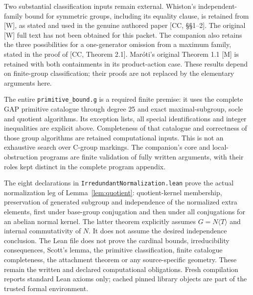 Two substantial classification inputs remain external. Whiston's
independent-family bound for symmetric groups, including its equality
clause, is retained from [W], as stated and used in the genuine authored
paper [CC, \S\S1--2]. The original [W] full text has not been obtained
for this packet. The companion also retains the three possibilities
for a one-generator omission from a maximum family, stated in the
proof of [CC, Theorem 2.1]. Mar\'oti's original Theorem 1.1 [M] is
retained with both containments in its product-action case. These
results depend on finite-group classification; their proofs are not
replaced by the elementary arguments here.

The entire \texttt{primitive\_bound.g} is a required finite premise:
it uses the complete GAP primitive catalogue through degree 25 and
exact maximal-subgroup, socle and quotient algorithms. Its exception
lists, all special identifications and integer inequalities are explicit
above. Completeness of that catalogue and correctness of those group
algorithms are retained computational inputs. This is not an exhaustive
search over C-group markings. The companion's core and local-obstruction
programs are finite validation of fully written arguments, with their
roles kept distinct in the complete program appendix.

The eight declarations in \texttt{IrredundantNormalization.lean}
prove the actual normalization leg of Lemma~\ref{lem:quotient}:
quotient-kernel membership, preservation of generated subgroup and
independence of the normalized extra elements, first under base-group
conjugation and then under all conjugations for an abelian normal
kernel. The latter theorem explicitly assumes $G=N\langle T\rangle$
and internal commutativity of $N$. It does not assume the desired
independence conclusion. The Lean file does not prove the cardinal
bounds, irreducibility consequences, Scott's lemma, the primitive
classification, finite catalogue completeness, the attachment theorem
or any source-specific geometry. These remain the written and declared
computational obligations. Fresh compilation reports standard Lean
axioms only; cached pinned library objects are part of the trusted
formal environment.


